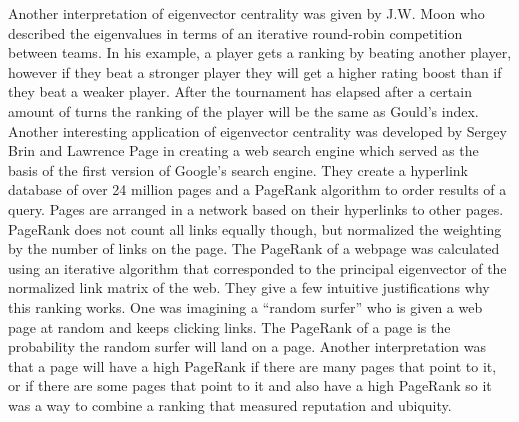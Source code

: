 \documentclass{article}
\begin{document}
Another interpretation of eigenvector centrality was given by J.W. Moon who described the eigenvalues in terms of an iterative round-robin competition between teams.  In his example, a player gets a ranking by beating another player, however if they beat a stronger player they will get a higher rating boost than if they beat a weaker player.  After the tournament has elapsed after a certain amount of turns the ranking of the player will be the same as Gould’s index.\\

Another interesting application of eigenvector centrality was developed by Sergey Brin and Lawrence Page in creating a web search engine which served as the basis of the first version of Google’s search engine.  They create a hyperlink database of over 24 million pages and a PageRank algorithm to order results of a query.  Pages are arranged in a network based on their hyperlinks to other pages.  PageRank does not count all links equally though, but normalized the weighting by the number of links on the page.  The PageRank of a webpage was calculated using an iterative algorithm that corresponded to the principal eigenvector of the normalized link matrix of the web.  They give a few intuitive justifications why this ranking works.  One was imagining a “random surfer” who is given a web page at random and keeps clicking links.  The PageRank of a page is the probability the random surfer will land on a page.  Another interpretation was that a page will have a high PageRank if there are many pages that point to it, or if there are some pages that point to it and also have a high PageRank so it was a way to combine a ranking that measured reputation and ubiquity.\\
\end{document}
